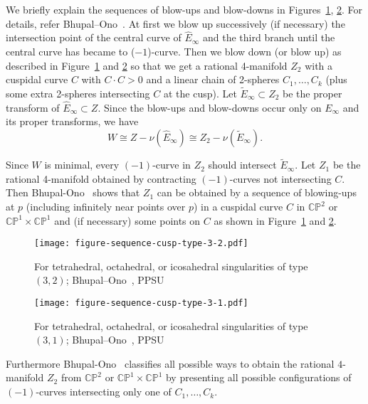 \documentclass[reqno, twoside, a4paper]{amsart}
\theoremstyle{definition}
\numberwithin{equation}{section}
\begin{document}
We briefly explain the sequences of blow-ups and blow-downs in Figures~\ref{figure:sequence-TOI-32}, \ref{figure:sequence-TOI-31}.  For details, refer Bhupal--Ono~\cite{Bhupal-Ono-2012}. At first we blow up successively (if necessary) the intersection point of the central curve of $\widehat{E}_{\infty}$ and the third branch until the central curve has became to ($-1$)-curve. Then we blow down (or blow up) as described in Figure~\ref{figure:sequence-TOI-32} and \ref{figure:sequence-TOI-31} so that we get a rational 4-manifold $Z_2$ with a cuspidal curve $C$ with $C \cdot C > 0$ and a linear chain of 2-spheres $C_1, \dotsc, C_k$ (plus some extra 2-spheres intersecting $C$ at the cusp). Let $\widetilde{E}_{\infty} \subset Z_2$ be the proper transform of $\widehat{E}_{\infty} \subset Z$. Since the blow-ups and blow-downs occur only on $E_{\infty}$ and its proper transforms, we have
%
\begin{equation*}%
W \cong Z - \nu(\widehat{E}_{\infty}) \cong Z_2 - \nu(\widetilde{E}_{\infty}).
\end{equation*}

Since $W$ is minimal, every $(-1)$-curve in $Z_2$ should intersect $\widetilde{E}_{\infty}$. Let $Z_1$ be the rational 4-manifold obtained by contracting $(-1)$-curves not intersecting $C$. Then Bhupal-Ono~\cite{Bhupal-Ono-2012} shows that $Z_1$ can be obtained by a sequence of blowing-ups at $p$ (including infinitely near points over $p$) in a cuspidal curve $C$ in $\mathbb{CP}^2$ or $\mathbb{CP}^1 \times \mathbb{CP}^1$ and (if necessary) some points on $C$ as shown in  Figure~\ref{figure:sequence-TOI-32} and \ref{figure:sequence-TOI-31}.

\begin{figure}[tp]
\centering
\texttt{[image: figure-sequence-cusp-type-3-2.pdf]}
\caption{For tetrahedral, octahedral, or icosahedral singularities of type $(3,2)$; Bhupal--Ono~\cite[Figure~3]{Bhupal-Ono-2012}, PPSU~\cite[Figure~6]{PPSU-2015}}
\label{figure:sequence-TOI-32}
\end{figure}

\begin{figure}[tp]
\centering
\texttt{[image: figure-sequence-cusp-type-3-1.pdf]}
\caption{For tetrahedral, octahedral, or icosahedral singularities of type $(3,1)$; Bhupal--Ono~\cite[Figure~5, 6, 10]{Bhupal-Ono-2012}, PPSU~\cite[Figure~7]{PPSU-2015}}
\label{figure:sequence-TOI-31}
\end{figure}

Furthermore Bhupal-Ono~\cite[Section~5]{Bhupal-Ono-2012} classifies all possible ways to obtain the rational $4$-manifold $Z_2$ from $\mathbb{CP}^2$ or $\mathbb{CP}^1 \times \mathbb{CP}^1$ by presenting all possible configurations of $(-1)$-curves intersecting only one of $C_1, \dotsc, C_k$.
\end{document}
